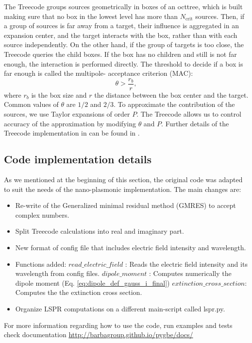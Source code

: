 The Treecode groups sources geometrically in boxes of an octtree, which is built making
sure that no box in the lowest level has more than $N_\text{crit}$ sources. Then, if a group of
sources is far away from a target, their influence is aggregated in an expansion center,
and the target interacts with the box, rather than with each source independently.
On the other hand, if the group of targets is too close, the Treecode queries the child
boxes. If the box has no children and still is not far enough, the interaction is 
performed directly. The threshold to decide if a box is far enough is called the multipole-
acceptance criterion (MAC):
%
\begin{equation}
\theta > \frac{r_b}{r},
\end{equation}
%
where $r_b$ is the box size and $r$ the distance between the box center and the target.
Common values of $\theta$ are $1/2$ and $2/3$.
To approximate the contribution of the sources, we use Taylor expansions
of order $P$.
The Treecode allows us to control accuracy of the approximation by modifying $\theta$ and $P$.
Further details of the Treecode implementation in \pygbe can be found in \cite{CooperBarba-share154331,CooperBardhanBarba2013}.

\subsection{Code implementation details} \label{sec:code_imp}

As we mentioned at the beginning of this section, the original \pygbe code was 
adapted to suit the needs of the nano-plasmonic implementation. The main changes
are:

\begin{itemize}
    \item Re-write of the Generalized minimal residual method (GMRES) to accept complex numbers. 
    \item Split Treecode calculations into real and imaginary part.
    \item New format of config file that includes electric field intensity and  wavelength.
    \item Functions added:
    \subitem $read\_electric\_field$ : Reads the electric field intensity and its wavelength from config files.
    \subitem $dipole\_moment$ : Computes numerically the dipole moment (Eq. \eqref{eq:dipole_def_gauss_i_final})
    \subitem $extinction\_cross\_section$: Computes the the extinction cross section.
    \item Organize LSPR computations on a different main-script called lspr.py.
\end{itemize}

For more information regarding how to use the code, run examples and tests check
\pygbe documentation \url{http://barbagroup.github.io/pygbe/docs/}

